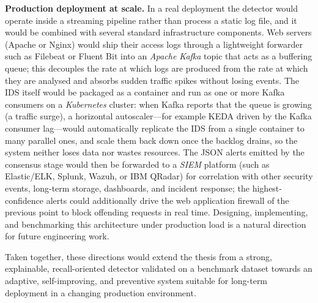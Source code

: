 \documentclass[12pt,a4paper]{report}
\begin{document}
\begin{romanlist}
  \item \textbf{Production deployment at scale.} In a real deployment the
        detector would operate inside a streaming pipeline rather than
        process a static log file, and it would be combined with several
        standard infrastructure components. Web servers (Apache or Nginx)
        would ship their access logs through a lightweight forwarder such as
        Filebeat or Fluent Bit into an \emph{Apache Kafka} topic that acts as
        a buffering queue; this decouples the rate at which logs are produced
        from the rate at which they are analysed and absorbs sudden traffic
        spikes without losing events. The IDS itself would be packaged as a
        container and run as one or more Kafka consumers on a
        \emph{Kubernetes} cluster: when Kafka reports that the queue is
        growing (a traffic surge), a horizontal autoscaler---for example KEDA
        driven by the Kafka consumer lag---would automatically replicate the
        IDS from a single container to many parallel ones, and scale them
        back down once the backlog drains, so the system neither loses data
        nor wastes resources. The JSON alerts emitted by the consensus stage
        would then be forwarded to a \emph{SIEM} platform (such as Elastic/ELK,
        Splunk, Wazuh, or IBM QRadar) for correlation with other security
        events, long-term storage, dashboards, and incident response; the
        highest-confidence alerts could additionally drive the web application
        firewall of the previous point to block offending requests in real
        time. Designing, implementing, and benchmarking this architecture
        under production load is a natural direction for future engineering
        work.
\end{romanlist}

Taken together, these directions would extend the thesis from a strong,
explainable, recall-oriented detector validated on a benchmark dataset
towards an adaptive, self-improving, and preventive system suitable for
long-term deployment in a changing production environment.

\end{document}
